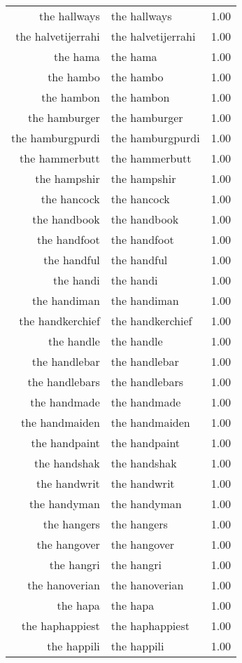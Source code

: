 \begin{table}[ht]
\begin{tabular}{rlr}
  the hallways & the hallways & 1.00 \\ 
  the halvetijerrahi & the halvetijerrahi & 1.00 \\ 
  the hama & the hama & 1.00 \\ 
  the hambo & the hambo & 1.00 \\ 
  the hambon & the hambon & 1.00 \\ 
  the hamburger & the hamburger & 1.00 \\ 
  the hamburgpurdi & the hamburgpurdi & 1.00 \\ 
  the hammerbutt & the hammerbutt & 1.00 \\ 
  the hampshir & the hampshir & 1.00 \\ 
  the hancock & the hancock & 1.00 \\ 
  the handbook & the handbook & 1.00 \\ 
  the handfoot & the handfoot & 1.00 \\ 
  the handful & the handful & 1.00 \\ 
  the handi & the handi & 1.00 \\ 
  the handiman & the handiman & 1.00 \\ 
  the handkerchief & the handkerchief & 1.00 \\ 
  the handle & the handle & 1.00 \\ 
  the handlebar & the handlebar & 1.00 \\ 
  the handlebars & the handlebars & 1.00 \\ 
  the handmade & the handmade & 1.00 \\ 
  the handmaiden & the handmaiden & 1.00 \\ 
  the handpaint & the handpaint & 1.00 \\ 
  the handshak & the handshak & 1.00 \\ 
  the handwrit & the handwrit & 1.00 \\ 
  the handyman & the handyman & 1.00 \\ 
  the hangers & the hangers & 1.00 \\ 
  the hangover & the hangover & 1.00 \\ 
  the hangri & the hangri & 1.00 \\ 
  the hanoverian & the hanoverian & 1.00 \\ 
  the hapa & the hapa & 1.00 \\ 
  the haphappiest & the haphappiest & 1.00 \\ 
  the happili & the happili & 1.00 \\ 

\end{tabular}
\end{table}
